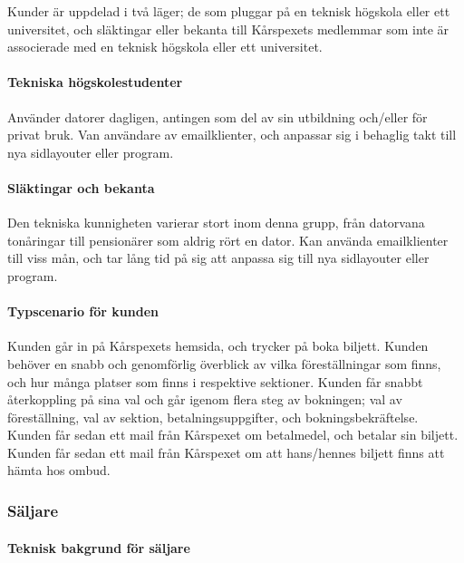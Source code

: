 \documentclass[a4paper, twoside, 11pt, titlepage]{article}
\begin{document}
			Kunder är uppdelad i två läger; de som pluggar på en teknisk högskola eller ett universitet, och släktingar eller bekanta till Kårspexets medlemmar som inte är associerade med en teknisk högskola eller ett universitet.

			\paragraph{Tekniska högskolestudenter}

			Använder datorer dagligen, antingen som del av sin utbildning och/eller för privat bruk. Van användare av emailklienter, och anpassar sig i behaglig takt till nya sidlayouter eller program.

			\paragraph{Släktingar och bekanta}

			Den tekniska kunnigheten varierar stort inom denna grupp, från datorvana tonåringar till pensionärer som aldrig rört en dator. Kan använda emailklienter till viss mån, och tar lång tid på sig att anpassa sig till nya sidlayouter eller program.

			\paragraph{Typscenario för kunden}

			Kunden går in på Kårspexets hemsida, och trycker på boka biljett. Kunden behöver en snabb och genomförlig överblick av vilka föreställningar som finns, och hur många platser som finns i respektive sektioner. Kunden får snabbt återkoppling på sina val och går igenom flera steg av bokningen; val av föreställning, val av sektion, betalningsuppgifter, och bokningsbekräftelse. Kunden får sedan ett mail från Kårspexet om betalmedel, och betalar sin biljett. Kunden får sedan ett mail från Kårspexet om att hans/hennes biljett finns att hämta hos ombud.

	\subsubsection{Säljare}



			\paragraph{Teknisk bakgrund för säljare}
\end{document}
